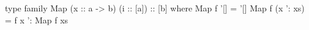 \begin{code}
type family Map (x :: a -> b) (i :: [a]) :: [b] where
  Map f '[]       = '[]
  Map f (x ': xs) = f x ': Map f xs
\end{code}
